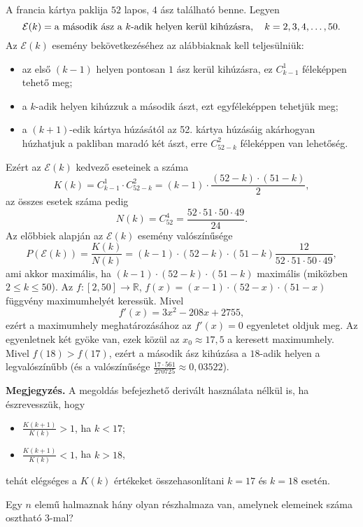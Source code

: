 \begin{solution}
A francia kártya paklija $52$ lapos, $4$ ász található benne. Legyen
\[
\mathcal{E}(k)=\text{a második ász a \ensuremath{k}-adik helyen kerül kihúzásra},\quad k=2,3,4,\ldots,50.
\]
Az $\mathcal{E}(k)$ esemény bekövetkezéséhez az alábbiaknak kell
teljesülniük: 
\begin{itemize}
\item az első $(k-1)$ helyen pontosan $1$ ász kerül kihúzásra, ez $C_{k-1}^{1}$
féleképpen tehető meg; 
\item a $k$-adik helyen kihúzzuk a második ászt, ezt egyféleképpen tehetjük
meg; 
\item a $(k+1)$-edik kártya húzásától az 52. kártya húzásáig akárhogyan
húzhatjuk a pakliban maradó két ászt, erre $C_{52-k}^{2}$ féleképpen
van lehetőség. 
\end{itemize}
Ezért az $\mathcal{E}(k)$ kedvező eseteinek a száma 
\[
K(k)=C_{k-1}^{1}\cdot C_{52-k}^{2}=(k-1)\cdot\frac{(52-k)\cdot(51-k)}{2},
\]
az összes esetek száma pedig 
\[
N(k)=C_{52}^{4}=\frac{52\cdot51\cdot50\cdot49}{24}.
\]
Az előbbiek alapján az $\mathcal{E}(k)$ esemény valószínűsége 
\[
P(\mathcal{E}(k))=\frac{K(k)}{N(k)}=(k-1)\cdot(52-k)\cdot(51-k)\frac{12}{52\cdot51\cdot50\cdot49},
\]
ami akkor maximális, ha $(k-1)\cdot(52-k)\cdot(51-k)$ maximális (miközben
$2\leq k\leq50$). Az $f\colon[2,50]\to\mathbb{R}$, $f(x)=(x-1)\cdot(52-x)\cdot(51-x)$
függvény maximumhelyét keressük. Mivel 
\[
f'(x)=3x^{2}-208x+2755,
\]
ezért a maximumhely meghatározásához az $f'(x)=0$ egyenletet oldjuk
meg. Az egyenletnek két gyöke van, ezek közül az $x_{0}\approx17,5$
a keresett maximumhely. Mivel $f(18)>f(17)$, ezért a második ász
kihúzása a $18$-adik helyen a legvalószínűbb (és a valószínűsége
$\frac{17\cdot561}{270725}\approx0,03522$).

\textbf{Megjegyzés.} A megoldás befejezhető derivált használata nélkül
is, ha észrevesszük, hogy 
\begin{itemize}
\item $\frac{K(k+1)}{K(k)}>1$, ha $k<17$; 
\item $\frac{K(k+1)}{K(k)}<1$, ha $k>18$, 
\end{itemize}
tehát elégséges a $K(k)$ értékeket összehasonlítani $k=17$ és $k=18$
esetén. 
\end{solution}
\begin{extraproblem}
Egy $n$ elemű halmaznak hány olyan részhalmaza van, amelynek elemeinek
száma osztható $3$-mal? 
\end{extraproblem}

